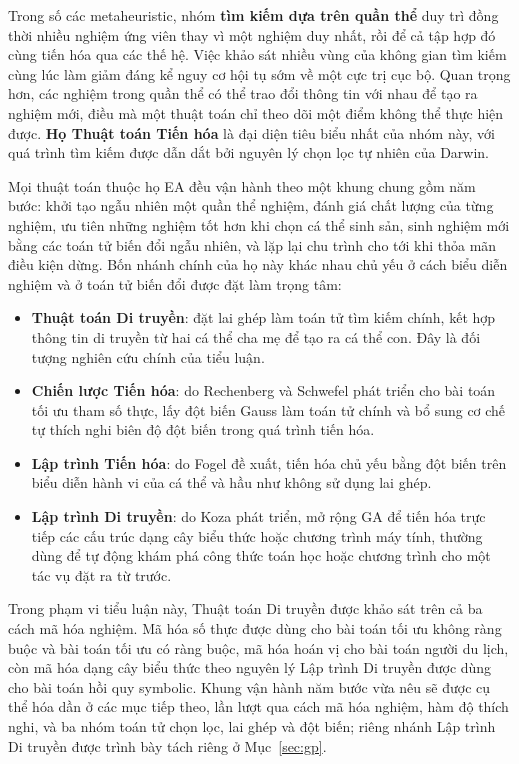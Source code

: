 Trong số các metaheuristic, nhóm \textbf{tìm kiếm dựa trên quần thể}
duy trì đồng thời nhiều nghiệm ứng viên thay vì một nghiệm duy nhất, rồi
để cả tập hợp đó cùng tiến hóa qua các thế hệ. Việc khảo sát nhiều vùng
của không gian tìm kiếm cùng lúc làm giảm đáng kể nguy cơ hội tụ sớm về
một cực trị cục bộ. Quan trọng hơn, các nghiệm trong quần thể có thể
trao đổi thông tin với nhau để tạo ra nghiệm mới, điều mà một thuật toán
chỉ theo dõi một điểm không thể thực hiện được. \textbf{Họ Thuật toán
Tiến hóa} là đại diện tiêu biểu nhất của
nhóm này, với quá trình tìm kiếm được dẫn dắt bởi nguyên lý chọn lọc tự
nhiên của Darwin.

Mọi thuật toán thuộc họ EA đều vận hành theo một khung chung gồm năm
bước: khởi tạo ngẫu nhiên một quần thể nghiệm, đánh giá chất lượng của
từng nghiệm, ưu tiên những nghiệm tốt hơn khi chọn cá thể sinh sản, sinh
nghiệm mới bằng các toán tử biến đổi ngẫu nhiên, và lặp lại chu trình
cho tới khi thỏa mãn điều kiện dừng. Bốn nhánh chính của họ này khác
nhau chủ yếu ở cách biểu diễn nghiệm và ở toán tử biến đổi được đặt làm
trọng tâm:

\begin{itemize}
    \item \textbf{Thuật toán Di truyền}: đặt
    lai ghép làm toán tử tìm kiếm chính, kết hợp thông tin di truyền từ
    hai cá thể cha mẹ để tạo ra cá thể con. Đây là đối tượng nghiên cứu
    chính của tiểu luận.
    \item \textbf{Chiến lược Tiến hóa}: do
    Rechenberg và Schwefel phát triển cho bài toán tối ưu tham số thực,
    lấy đột biến Gauss làm toán tử chính và bổ sung cơ chế tự thích nghi
    biên độ đột biến trong quá trình tiến hóa.
    \item \textbf{Lập trình Tiến hóa}:
    do Fogel đề xuất, tiến hóa chủ yếu bằng đột biến trên biểu diễn hành
    vi của cá thể và hầu như không sử dụng lai ghép.
    \item \textbf{Lập trình Di truyền}: do
    Koza phát triển, mở rộng GA để tiến hóa trực tiếp các cấu trúc dạng
    cây biểu thức hoặc chương trình máy tính, thường dùng để tự động
    khám phá công thức toán học hoặc chương trình cho một tác vụ đặt ra
    từ trước.
\end{itemize}

Trong phạm vi tiểu luận này, Thuật toán Di truyền được khảo sát trên cả
ba cách mã hóa nghiệm. Mã hóa số thực được dùng cho bài toán tối ưu
không ràng buộc và bài toán tối ưu có ràng buộc, mã hóa hoán vị cho bài
toán người du lịch, còn mã hóa dạng cây biểu thức theo nguyên lý Lập
trình Di truyền được dùng cho bài toán hồi quy symbolic. Khung vận hành
năm bước vừa nêu sẽ được cụ thể hóa dần ở các mục tiếp theo, lần lượt
qua cách mã hóa nghiệm, hàm độ thích nghi, và ba nhóm toán tử chọn lọc,
lai ghép và đột biến; riêng nhánh Lập trình Di truyền được trình bày
tách riêng ở Mục~\ref{sec:gp}.


